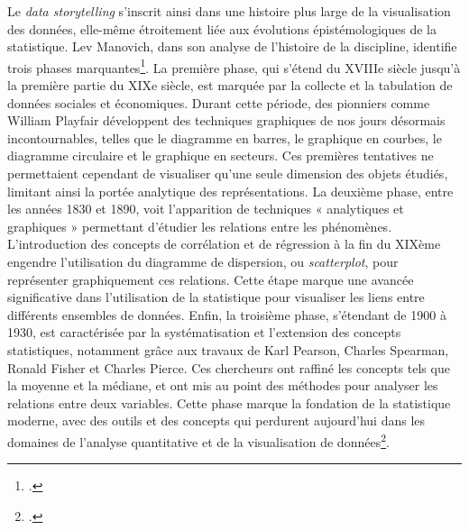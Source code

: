 Le \textit{data storytelling} s’inscrit ainsi dans une histoire plus large de la visualisation des données, elle-même étroitement liée aux évolutions épistémologiques de la statistique. Lev Manovich, dans son analyse de l’histoire de la discipline, identifie trois phases marquantes\footcite[p.19-20]{manovich_data_2015}. 
La première phase, qui s’étend du XVIIIe siècle jusqu’à la première partie du XIXe siècle, est marquée par la collecte et la tabulation de données sociales et économiques. Durant cette période, des pionniers comme William Playfair développent des techniques graphiques de nos jours désormais incontournables, telles que le diagramme en barres, le graphique en courbes, le diagramme circulaire et le graphique en secteurs. Ces premières tentatives ne permettaient cependant de visualiser qu’une seule dimension des objets étudiés, limitant ainsi la portée analytique des représentations.
La deuxième phase, entre les années 1830 et 1890, voit l’apparition de techniques « analytiques et graphiques » permettant d’étudier les relations entre les phénomènes. L’introduction des concepts de corrélation et de régression à la fin du XIXème engendre l’utilisation du diagramme de dispersion, ou \textit{scatterplot}, pour représenter graphiquement ces relations. Cette étape marque une avancée significative dans l’utilisation de la statistique pour visualiser les liens entre différents ensembles de données.
Enfin, la troisième phase, s’étendant de 1900 à 1930, est caractérisée par la systématisation et l’extension des concepts statistiques, notamment grâce aux travaux de Karl Pearson, Charles Spearman, Ronald Fisher et Charles Pierce. Ces chercheurs ont raffiné les concepts tels que la moyenne et la médiane, et ont mis au point des méthodes pour analyser les relations entre deux variables. Cette phase marque la fondation de la statistique moderne, avec des outils et des concepts qui perdurent aujourd’hui dans les domaines de l’analyse quantitative et de la visualisation de données\footcite[p.19-20]{manovich_data_2015}. 

